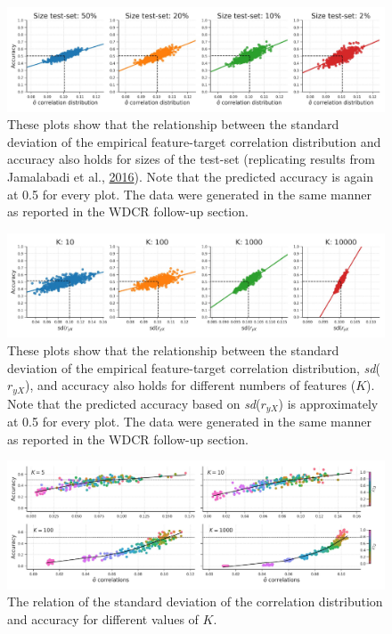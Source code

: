 \documentclass[12pt,american,a4paper,oneside,]{memoir} %
\begin{document}
\begin{figure}
\centering
\includegraphics{_bookdown_files/confounds-decoding-files/figures/figure_S16.pdf}
\caption{\label{fig:fig-confounds-decoding-S16}These plots show that the relationship between the standard deviation of the empirical feature-target correlation distribution and accuracy also holds for sizes of the test-set (replicating results from Jamalabadi et al., \protect\hyperlink{ref-Jamalabadi2016-gr}{2016}). Note that the predicted accuracy is again at 0.5 for every plot. The data were generated in the same manner as reported in the WDCR follow-up section.}
\end{figure}



\begin{figure}
\centering
\includegraphics{_bookdown_files/confounds-decoding-files/figures/figure_S17.pdf}
\caption{\label{fig:fig-confounds-decoding-S17}These plots show that the relationship between the standard deviation of the empirical feature-target correlation distribution, \emph{sd}(\(r_{yX}\)), and accuracy also holds for different numbers of features (\(K\)). Note that the predicted accuracy based on \emph{sd}(\(r_{yX}\)) is approximately at 0.5 for every plot. The data were generated in the same manner as reported in the WDCR follow-up section.}
\end{figure}



\begin{figure}
\centering
\includegraphics{_bookdown_files/confounds-decoding-files/figures/figure_S18.pdf}
\caption{\label{fig:fig-confounds-decoding-S18}The relation of the standard deviation of the correlation distribution and accuracy for different values of \(K\).}
\end{figure}
\end{document}
